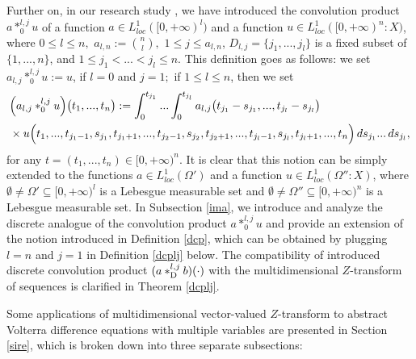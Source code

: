 \documentclass{amsart}
\theoremstyle{definition}
\theoremstyle{remark}
\numberwithin{equation}{section}
\begin{document}
Further on, in our research study \cite{mvlt}, we have introduced the convolution product $a\ast_{0}^{l,j}u$ of a function $a\in L_{loc}^{1}([0,+\infty)^{l})$ and a function $u\in L_{loc}^{1}([0,+\infty)^{n} : X)$, where
$0\leq l\leq n,$ $a_{l,n}:={n\choose l},$ $1\leq j\leq a_{l,n}$, $D_{l,j}=\{j_{1},...,j_{l}\}$ is a fixed subset of $\{1,...,n\}$, and $1\leq j_{1}<...<j_{l}\leq n.$ This definition goes as follows: we set $a_{l,j}\ast_{0}^{l,j}u:=u$, if $l=0 $ and $j=1;$ if $1\leq l\leq n$, then we set
\begin{align*}  &
\Bigl( a_{l,j}\ast_{0}^{l,j}u\Bigr)\bigl(t_{1},...,t_{n}\bigr):=\int^{t_{j_{1}}}_{0}...\int^{t_{j_{l}}}_{0}a_{l,j}\bigl( t_{j_{1}}-s_{j_{1}},..., t_{j_{l}}-s_{j_{l}}\bigr)
\\ & \times u\Bigl(t_{1},...,t_{j_{1}-1},s_{j_{1}},t_{j_{1}+1},...,t_{j_{2}-1},s_{j_{2}},t_{j_{2}+1},...,t_{j_{l}-1}, s_{j_{l}},t_{j_{l}+1},...,t_{n}\Bigr)\, ds_{j_{1}}...\, ds_{j_{l}},
\end{align*}
for any $t=(t_{1},...,t_{n}) \in [0,+\infty)^{n}.$ It is clear that this notion can be simply extended to the functions $a\in L_{loc}^{1}(\Omega')$ and a function $u\in L_{loc}^{1}(\Omega'' : X)$, where $\emptyset \neq \Omega'\subseteq [0,+\infty)^{l}$ is a Lebesgue measurable set and $\emptyset \neq \Omega''\subseteq [0,+\infty)^{n}$ is a Lebesgue measurable set. In Subsection \ref{ima}, we introduce and analyze the discrete analogue of the convolution product $a\ast_{0}^{l,j}u$ and provide an extension of the notion introduced in Definition \ref{dcp}, which can be obtained by plugging $l=n$ and $j=1$ in Definition \ref{dcplj} below. The compatibility of introduced discrete convolution product $(a \ast_{{\rm D}}^{l,j}b) (\cdot)$ with the multidimensional $Z$-transform of sequences is clarified in Theorem \ref{dcplj}. 

Some applications of multidimensional vector-valued $Z$-transform to abstract Volterra difference equations with multiple variables are presented in Section \ref{sire}, which is broken down into three separate subsections:
 
\end{document}
